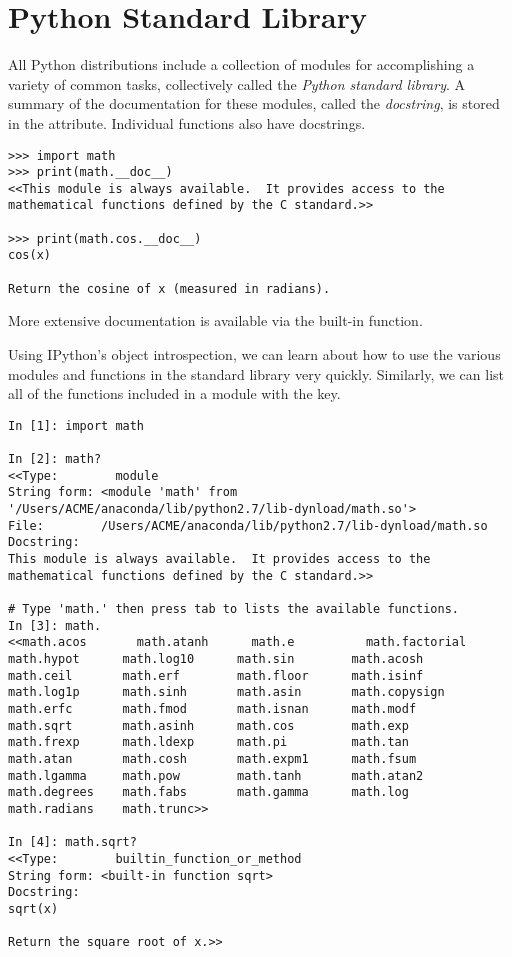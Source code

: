 \section*{Python Standard Library}


All Python distributions include a collection of modules for accomplishing a variety of common tasks, collectively called the \emph{Python standard library}.
A summary of the documentation for these modules, called the \emph{docstring}, is stored in the  attribute.
Individual functions also have docstrings.

\begin{lstlisting}
>>> import math
>>> print(math.__doc__)
<<This module is always available.  It provides access to the
mathematical functions defined by the C standard.>>

>>> print(math.cos.__doc__)
cos(x)

Return the cosine of x (measured in radians).
\end{lstlisting}

More extensive documentation is available via the  built-in function.

Using IPython's object introspection, we can learn about how to use the various modules and functions in the standard library very quickly.
Similarly, we can list all of the functions included in a module with the  key.

\begin{lstlisting}
In [1]: import math

In [2]: math?
<<Type:        module
String form: <module 'math' from '/Users/ACME/anaconda/lib/python2.7/lib-dynload/math.so'>
File:        /Users/ACME/anaconda/lib/python2.7/lib-dynload/math.so
Docstring:
This module is always available.  It provides access to the
mathematical functions defined by the C standard.>>

# Type 'math.' then press tab to lists the available functions.
In [3]: math.
<<math.acos       math.atanh      math.e          math.factorial  
math.hypot      math.log10      math.sin        math.acosh      
math.ceil       math.erf        math.floor      math.isinf      
math.log1p      math.sinh       math.asin       math.copysign   
math.erfc       math.fmod       math.isnan      math.modf       
math.sqrt       math.asinh      math.cos        math.exp        
math.frexp      math.ldexp      math.pi         math.tan        
math.atan       math.cosh       math.expm1      math.fsum       
math.lgamma     math.pow        math.tanh       math.atan2      
math.degrees    math.fabs       math.gamma      math.log        
math.radians    math.trunc>>

In [4]: math.sqrt?
<<Type:        builtin_function_or_method
String form: <built-in function sqrt>
Docstring:
sqrt(x)

Return the square root of x.>>
\end{lstlisting}

